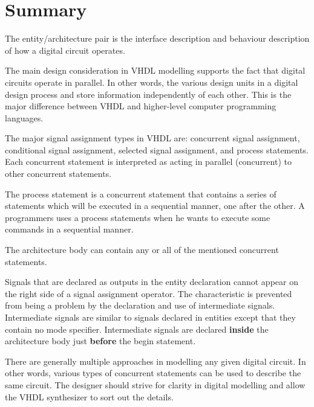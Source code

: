 \section{Summary} 
\begin{my_list}
\item The entity/architecture pair is the interface description and behaviour description of how a digital circuit operates.
\item The main design consideration in VHDL modelling supports the fact that digital circuits operate in parallel. In other words, the various design units in a digital design process and store information independently of each other. This is the major difference between VHDL and higher-level computer programming languages.
\item The major signal assignment types in VHDL are: concurrent signal assignment, conditional signal assignment, selected signal assignment, and process statements. Each concurrent statement is interpreted as acting in parallel (concurrent) to other concurrent statements.
\item The process statement is a concurrent statement that contains a series of statements which will be executed in a sequential manner, one after the other. A programmers uses a process statements when he wants to execute some commands in a sequential manner.
\item The architecture body can contain any or all of the mentioned concurrent statements.
\item Signals that are declared as outputs in the entity declaration cannot appear on the right side of a signal assignment operator. The characteristic is prevented from being a problem by the declaration and use of intermediate signals. Intermediate signals are similar to signals declared in entities except that they contain no mode specifier. Intermediate signals are declared \textbf{inside} the architecture body just \textbf{before} the begin statement.
\item There are generally multiple approaches in modelling any given digital circuit. In other words, various types of concurrent statements can be used to describe the same circuit. The designer should strive for clarity in digital modelling and allow the VHDL synthesizer to sort out the details.
\end{my_list}

